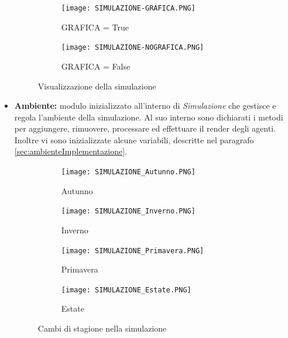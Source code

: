 \documentclass[11pt]{article}
\begin{document}
\begin{itemize}
    \begin{figure}[h!]
	\begin{subfigure}{\textwidth}
    \centering
     \texttt{[image: SIMULAZIONE-GRAFICA.PNG]}
     \caption{GRAFICA = True}
     \label{fig:LVPhaseSpace}
	\end{subfigure}
	\begin{subfigure}{\textwidth}
		\centering
     \texttt{[image: SIMULAZIONE-NOGRAFICA.PNG]}
     \caption{GRAFICA = False}
     \label{fig:conigliVolpi}
	\end{subfigure}
	\caption{Visualizzazione della simulazione}
\end{figure}
    
    \item \textbf{Ambiente:} modulo inizializzato all'interno di \textit{Simulazione} che gestisce e regola l'ambiente della simulazione. Al suo interno sono dichiarati i metodi per aggiungere, rimuovere, processare ed effettuare il render degli agenti. Inoltre vi sono inizializzate alcune variabili, descritte nel paragrafo \ref{sec:ambienteImplementazione}.  

\begin{figure}[h!]
	\hspace{-5mm}
	\begin{subfigure}{.5\textwidth}
         \centering
         \texttt{[image: SIMULAZIONE\_Autunno.PNG]}
         \caption{Autunno}
         \label{fig:autunno}
	\end{subfigure}
	\begin{subfigure}{.5\textwidth}
		\hspace{7mm}
		\centering
        \texttt{[image: SIMULAZIONE\_Inverno.PNG]}
        \caption{Inverno}
        \label{fig:inverno}
	\end{subfigure}

	\hspace{-5mm}
	\begin{subfigure}{.5\textwidth}
         \centering
         \texttt{[image: SIMULAZIONE\_Primavera.PNG]}
         \caption{Primavera}
         \label{fig:primavera}
	\end{subfigure}
	\begin{subfigure}{.5\textwidth}
		\hspace{7mm}
		\centering
        \texttt{[image: SIMULAZIONE\_Estate.PNG]}
        \caption{Estate}
        \label{fig:estate}
	\end{subfigure}
	\caption{Cambi di stagione nella simulazione}
\end{figure}




\end{itemize}
\end{document}
